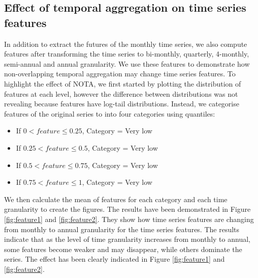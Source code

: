 \documentclass[]{elsarticle} %
\providecommand{\tightlist}{%
  \setlength{\itemsep}{0pt}\setlength{\parskip}{0pt}}
\begin{document}
\hypertarget{taeffect}{%
\subsection{Effect of temporal aggregation on time series
features}\label{taeffect}}

In addition to extract the futures of the monthly time series, we also
compute features after transforming the time series to bi-monthly,
quarterly, 4-monthly, semi-annual and annual granularity. We use these
features to demonstrate how non-overlapping temporal aggregation may
change time series features. To highlight the effect of NOTA, we first
started by plotting the distribution of features at each level, however
the difference between distributions was not revealing because features
have log-tail distributions. Instead, we categorise features of the
original series to into four categories using quantiles:

\begin{itemize}
\tightlist
\item
  If \(0 < feature \leqslant 0.25\), Category = Very low
\item
  If \(0.25 < feature \leqslant 0.5\), Category = Very low
\item
  If \(0.5 < feature \leqslant 0.75\), Category = Very low
\item
  If \(0.75 < feature \leqslant 1\), Category = Very low
\end{itemize}

We then calculate the mean of features for each category and each time
granularity to create the figures. The results have been demonstrated in
Figure \ref{fig:feature1} and \ref{fig:feature2}. They show how time
series features are changing from monthly to annual granularity for the
time series features. The results indicate that as the level of time
granularity increases from monthly to annual, some features become
weaker and may disappear, while others dominate the series. The effect
has been clearly indicated in Figure \ref{fig:feature1} and
\ref{fig:feature2}.
\end{document}
